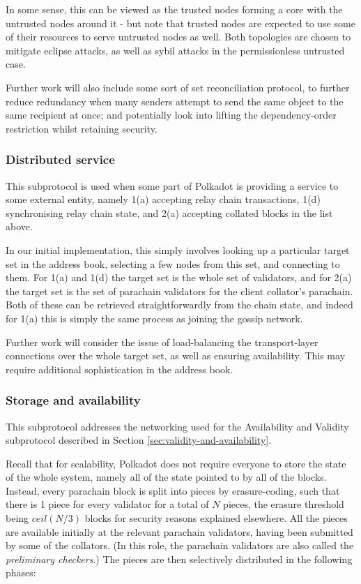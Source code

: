In some sense, this can be viewed as the trusted nodes forming a core with the untrusted nodes around it - but note that trusted nodes are expected to use some of their resources to serve untrusted nodes as well. Both topologies are chosen to mitigate eclipse attacks, as well as sybil attacks in the permissionless untrusted case.

Further work will also include some sort of set reconciliation protocol, to further reduce redundancy when many senders attempt to send the same object to the same recipient at once; and potentially look into lifting the dependency-order restriction whilst retaining security.

\subsubsection{Distributed service} \label{sec:net_service}

This subprotocol is used when some part of Polkadot is providing a service to some external entity, namely 1(a) accepting relay chain transactions, 1(d) synchronising relay chain state, and 2(a) accepting collated blocks in the list above.

In our initial implementation, this simply involves looking up a particular target set in the address book, selecting a few nodes from this set, and connecting to them. For 1(a) and 1(d) the target set is the whole set of validators, and for 2(a) the target set is the set of parachain validators for the client collator's parachain. Both of these can be retrieved straightforwardly from the chain state, and indeed for 1(a) this is simply the same process as joining the gossip network.

Further work will consider the issue of load-balancing the transport-layer connections over the whole target set, as well as ensuring availability. This may require additional sophistication in the address book.

\subsubsection{Storage and availability} \label{sec:net_storage}

This subprotocol addresses the networking used for the Availability and Validity subprotocol described in Section \ref{sec:validity-and-availability}.

Recall that for scalability, Polkadot does not require everyone to store the state of the whole system, namely all of the state pointed to by all of the blocks. Instead, every parachain block is split into pieces by erasure-coding, such that there is 1 piece for every validator for a total of $N$ pieces, the erasure threshold being $ceil(N/3)$ blocks for security reasons explained elsewhere. All the pieces are available initially at the relevant parachain validators, having been submitted by some of the collators. (In this role, the parachain validators are also called the \emph{preliminary checkers}.) The pieces are then selectively distributed in the following phases:

